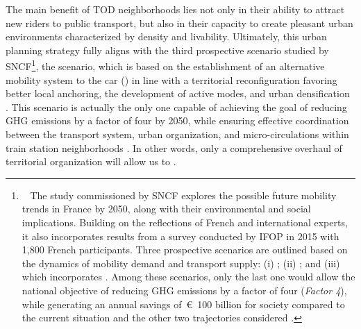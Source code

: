 \begin{refsegment}
The main benefit of \acrshort{TOD} neighborhoods \textcolor{blue}{\autocite[40]{bentayou_transit-oriented_2015}} lies not only in their ability to attract new riders to public transport, but also in their capacity to create pleasant urban environments characterized by density and livability. Ultimately, this urban planning strategy fully aligns with the third prospective scenario studied by SNCF\footnote{~
    The study commissioned by SNCF explores the possible future mobility trends in France by 2050, along with their environmental and social implications. Building on the reflections of French and international experts, it also incorporates results from a survey conducted by \acrfull{IFOP} in 2015 with 1,800 French participants. Three prospective scenarios are outlined based on the dynamics of mobility demand and transport supply: (i) ; (ii) ; and (iii)  which incorporates . Among these scenarios, only the last one would allow the national objective of reducing \acrfull{GHG} emissions by a factor of four (\textsl{Factor 4}), while generating an annual savings of~\euro~100 billion for society compared to the current situation and the other two trajectories considered \textcolor{blue}{\autocite[26-37]{sncf_vers_2015}}.
}, the  scenario, which is based on the establishment of an alternative mobility system to the car () in line with a territorial reconfiguration favoring better local anchoring, the development of active modes, and urban densification \textcolor{blue}{\autocite[26-37]{sncf_vers_2015}}. This scenario is actually the only one capable of achieving the goal of reducing \acrfull{GHG} emissions by a factor of four by 2050, while ensuring effective coordination between the transport system, urban organization, and micro-circulations within train station neighborhoods \textcolor{blue}{\autocite[148]{krakovitch_metropolitrain_2019}}. In other words, only a comprehensive overhaul of territorial organization will allow us to  \textcolor{blue}{\autocite[184]{ducharme_ville_2021}}.%


\end{refsegment}
